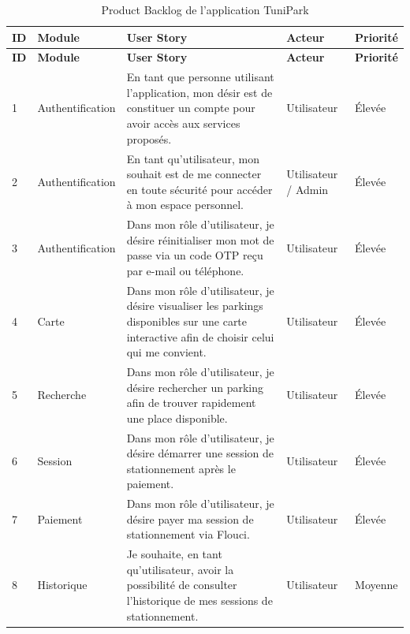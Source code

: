 \begin{longtable}{|p{}|p{}|p{}|p{}|p{}|}
\caption{Product Backlog de l'application TuniPark}
\label{tab:product_backlog}\\

\hline
\textbf{ID} & \textbf{Module} & \textbf{User Story} & \textbf{Acteur} & \textbf{Priorité} \\
\hline
\endfirsthead

\hline
\textbf{ID} & \textbf{Module} & \textbf{User Story} & \textbf{Acteur} & \textbf{Priorité} \\
\hline
\endhead

1 & Authentification & En tant que personne utilisant l'application, mon désir est de constituer un compte pour avoir accès aux services proposés. & Utilisateur & Élevée \\
\hline

2 & Authentification & En tant qu'utilisateur, mon souhait est de me connecter en toute sécurité pour accéder à mon espace personnel. & Utilisateur / Admin & Élevée \\
\hline

3 & Authentification & Dans mon rôle d'utilisateur, je désire réinitialiser mon mot de passe via un code OTP reçu par e-mail ou téléphone. & Utilisateur & Élevée \\
\hline

4 & Carte & Dans mon rôle d'utilisateur, je désire visualiser les parkings disponibles sur une carte interactive afin de choisir celui qui me convient. & Utilisateur & Élevée \\
\hline

5 & Recherche & Dans mon rôle d'utilisateur, je désire rechercher un parking afin de trouver rapidement une place disponible. & Utilisateur & Élevée \\
\hline

6 & Session & Dans mon rôle d'utilisateur, je désire démarrer une session de stationnement après le paiement. & Utilisateur & Élevée \\
\hline

7 & Paiement & Dans mon rôle d'utilisateur, je désire payer ma session de stationnement via Flouci. & Utilisateur & Élevée \\
\hline

8 & Historique & Je souhaite, en tant qu'utilisateur, avoir la possibilité de consulter l'historique de mes sessions de stationnement. & Utilisateur & Moyenne \\
\hline


\end{longtable}

